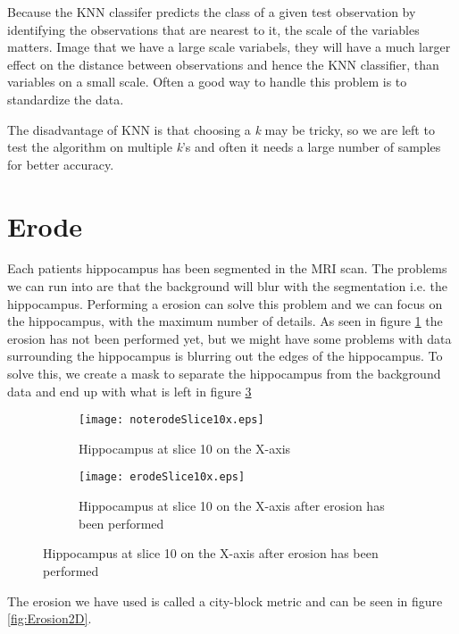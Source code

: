 Because the KNN classifer predicts the class of a given test observation by identifying the observations that are nearest to it, the scale of the variables matters. Image that we have a large scale variabels, they will have a much larger effect on the distance between observations and hence the KNN classifier, than variables on a small scale. Often a good way to handle this problem is to standardize the data.

The disadvantage of KNN is that choosing a \textit{k} may be tricky, so we are left to test the algorithm on multiple \textit{k}'s and often it needs a large number of samples for better accuracy.

\section{Erode}

Each patients hippocampus has been segmented in the MRI scan. The problems we can run into are that the background will blur with the segmentation i.e. the hippocampus. Performing a erosion can solve this problem and we can focus on the hippocampus, with the maximum number of details. As seen in figure \ref{fig:noterodeslice} the erosion has not been performed yet, but we might have some problems with data surrounding the hippocampus is blurring out the edges of the hippocampus. To solve this, we create a mask to separate the hippocampus from the background data and end up with what is left in figure \ref{fig:erodeslice}

\begin{figure}[H]
\begin{subfigure}{.5\textwidth}
  \centering
  \texttt{[image: noterodeSlice10x.eps]}
  \caption{Hippocampus at slice 10 on the X-axis}\label{fig:noterodeslice}
\end{subfigure}
\begin{subfigure}{.5\textwidth}
  \centering
  \texttt{[image: erodeSlice10x.eps]}
  \caption{Hippocampus at slice 10 on the X-axis after erosion has been performed}\label{fig:erodeslice}
\end{subfigure}
\end{figure}

The erosion we have used is called a city-block metric and can be seen in figure \ref{fig:Erosion2D}.

